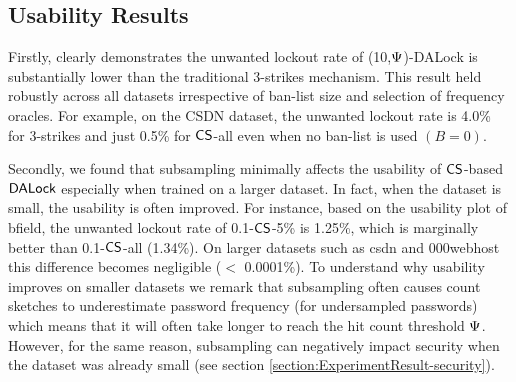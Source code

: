 \subsection{Usability Results}\label{section:ExperimentResult-usability} 

Firstly,  clearly demonstrates the unwanted lockout rate of (10,$\Psi$)-DALock is substantially lower than the traditional 3-strikes mechanism. This result held robustly across all datasets irrespective of ban-list size and selection of frequency oracles. For example, on the CSDN dataset, the unwanted lockout rate is 4.0\% for  3-strikes and just 0.5\% for $\mathsf{CS}$-all even when no ban-list is used $(B=0)$.

Secondly, we found that subsampling minimally affects the usability of $\mathsf{CS}$-based $\mathsf{DALock}$ especially when trained on a larger dataset. In fact, when the dataset is small, the usability is often improved. For instance, based on the usability plot of bfield, the unwanted lockout rate of 0.1-$\mathsf{CS}$-5\% is 1.25\%, which is marginally better than 0.1-$\mathsf{CS}$-all (1.34\%). On larger datasets such as csdn and 000webhost this difference becomes negligible ($<$ 0.0001\%). 
To understand why usability improves on smaller datasets we remark that subsampling often causes count sketches to underestimate password frequency (for undersampled passwords) which means that it will often take longer to reach the hit count threshold $\Psi$. However, for the same reason, subsampling can negatively impact security when the dataset was already small (see section \ref{section:ExperimentResult-security}). 

